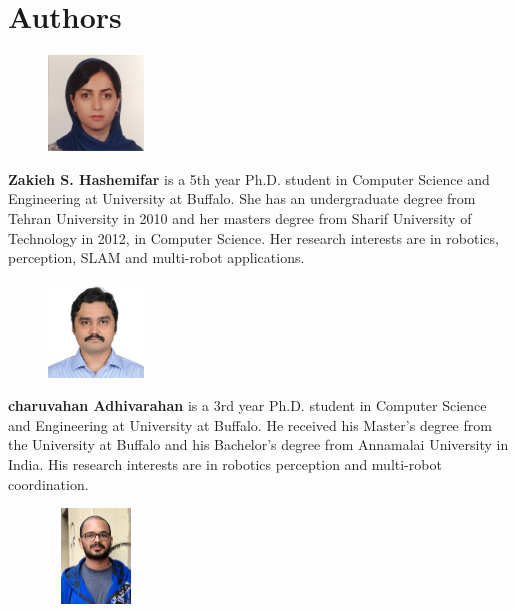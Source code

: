 \section{Authors}
\begin{figure} 
    \includegraphics[width=1in,height=1in,clip,keepaspectratio]{./figures/Zakieh.jpg}
  \end{figure}\par
  \textbf{Zakieh S. Hashemifar} is a 5th year Ph.D. student in Computer Science and
Engineering at University at Buffalo. She has an undergraduate degree from
Tehran University in 2010 and her masters degree from Sharif University of
Technology in 2012, in Computer Science. Her research interests are in robotics,
perception, SLAM and multi-robot applications.\par
\begin{figure} 
    \includegraphics[width=1in,height=1in,clip,keepaspectratio]{./figures/Charu.jpg}
  \end{figure}\par
  \textbf{charuvahan Adhivarahan} is a 3rd year Ph.D. student in Computer Science and
Engineering at University at Buffalo. He received his Master's degree from the University at Buffalo and his Bachelor's degree from Annamalai University in India. His research interests are in robotics perception and multi-robot coordination.\par
\begin{figure} 
    \includegraphics[width=1in,height=1in,clip,keepaspectratio]{./figures/Anand.jpg}
  \end{figure}\par
